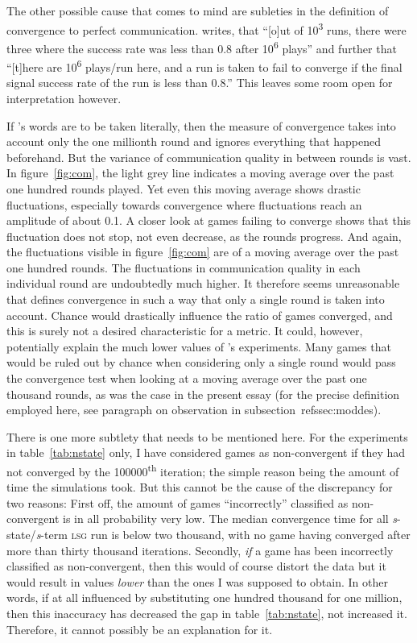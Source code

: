 \documentclass[
	DIV=calc,
	BCOR=0mm,
	pagesize,
]{scrartcl}
\newcommand{\lsg}{\textsc{lsg}}
\newcommand{\nslsg}[1]{\textit{#1}-state/\textit{#1}-term \lsg}
\begin{document}
The other possible cause that comes to mind are subleties in the definition of convergence to perfect communication.
\citet[sec.~2, unpaginated preprint]{barrett_numerical_2006} writes, that ``[o]ut of 10\textsuperscript{3} runs, there were three where the success rate was less than 0.8 after 10\textsuperscript{6} plays'' and further that ``[t]here are 10\textsuperscript{6} plays/run here, and a run is taken to fail to converge if the final signal success rate of the run is less than 0.8.''
This leaves some room open for interpretation however.

If \citeauthor{barrett_numerical_2006}'s words are to be taken literally, then the measure of convergence takes into account only the one millionth round and ignores everything that happened beforehand.
But the variance of communication quality in between rounds is vast.
In figure~\ref{fig:com}, the light grey line indicates a moving average over the past one hundred rounds played.
Yet even this moving average shows drastic fluctuations, especially towards convergence where fluctuations reach an amplitude of about 0.1.
A closer look at games failing to converge shows that this fluctuation does not stop, not even decrease, as the rounds progress.
And again, the fluctuations visible in figure~\ref{fig:com} are of a moving average over the past one hundred rounds.
The fluctuations in communication quality in each individual round are undoubtedly much higher.
It therefore seems unreasonable that \citeauthor{barrett_numerical_2006} defines convergence in such a way that only a single round is taken into account.
Chance would drastically influence the ratio of games converged, and this is surely not a desired characteristic for a metric.
It could, however, potentially explain the much lower values of \citeauthor{barrett_numerical_2006}'s experiments.
Many games that would be ruled out by chance when considering only a single round would pass the convergence test when looking at a moving average over the past one thousand rounds, as was the case in the present essay (for the precise definition employed here, see paragraph on observation in subsection~ref{ssec:moddes}).

There is one more subtlety that needs to be mentioned here.
For the experiments in table~\ref{tab:nstate} only, I have considered games as non-convergent if they had not converged by the 100000\textsuperscript{th} iteration; the simple reason being the amount of time the simulations took.
But this cannot be the cause of the discrepancy for two reasons:
First off, the amount of games ``incorrectly'' classified as non-convergent is in all probability very low.
The median convergence time for all \nslsg s run is below two thousand, with no game having converged after more than thirty thousand iterations.
Secondly, \emph{if} a game has been incorrectly classified as non-convergent, then this would of course distort the data but it would result in values \emph{lower} than the ones I was supposed to obtain.
In other words, if at all influenced by substituting one hundred thousand for one million, then this inaccuracy has decreased the gap in table~\ref{tab:nstate}, not increased it.
Therefore, it cannot possibly be an explanation for it.
\end{document}
